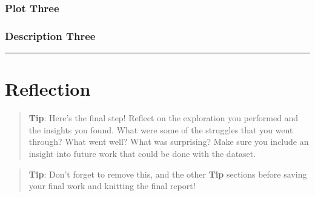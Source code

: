 \documentclass[]{article}
\begin{document}
\subsubsection{Plot Three}\label{plot-three}

\subsubsection{Description Three}\label{description-three}

\begin{center}\rule{0.5\linewidth}{\linethickness}\end{center}

\section{Reflection}\label{reflection}

\begin{quote}
\textbf{Tip}: Here's the final step! Reflect on the exploration you
performed and the insights you found. What were some of the struggles
that you went through? What went well? What was surprising? Make sure
you include an insight into future work that could be done with the
dataset.
\end{quote}

\begin{quote}
\textbf{Tip}: Don't forget to remove this, and the other \textbf{Tip}
sections before saving your final work and knitting the final report!
\end{quote}
\end{document}
